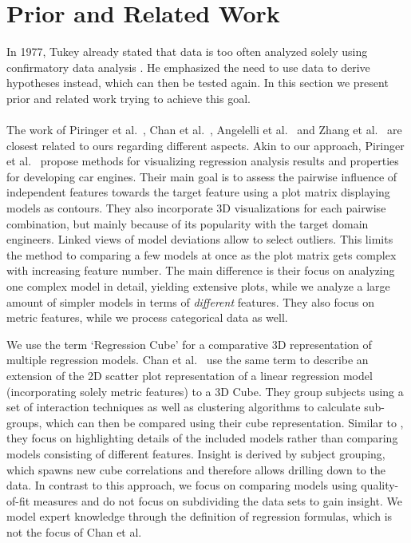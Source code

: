\documentclass[journal]{style/vgtc} 			          %
\begin{document}
\section{Prior and Related Work}
In 1977, Tukey already stated that data is too often analyzed solely using confirmatory data analysis \cite{Tukey}.
He emphasized the need to use data to derive hypotheses instead, which can then be tested again.
In this section we present prior and related work trying to achieve this goal.
\\\\
The work of Piringer et al.~\cite{Piringer}, Chan et al.~\cite{Chan}, Angelelli et al.~\cite{Angelelli} and Zhang et al.~\cite{Zhang2014} are closest related to ours regarding different aspects.
Akin to our approach, Piringer et al.~\cite{Piringer} propose methods for visualizing regression analysis results and properties for developing car engines.
Their main goal is to assess the pairwise influence of independent features towards the target feature using a plot matrix displaying models as contours.
They also incorporate 3D visualizations for each pairwise combination, but mainly because of its popularity with the target domain engineers.
Linked views of model deviations allow to select outliers.
This limits the method to comparing a few models at once as the plot matrix gets complex with increasing feature number.
The main difference is their focus on analyzing one complex model in detail, yielding extensive plots, while we analyze a large amount of simpler models in terms of \emph{different} features.
They also focus on metric features, while we process categorical data as well.

We use the term `Regression Cube' for a comparative 3D representation of multiple regression models.
Chan et al.~\cite{Chan} use the same term to describe an extension of the 2D scatter plot representation of a linear regression model (incorporating solely metric features) to a 3D Cube.
They group subjects using a set of interaction techniques as well as clustering algorithms to calculate sub-groups, which can then be compared using their cube representation.
Similar to \cite{Piringer}, they focus on highlighting details of the included models rather than comparing models consisting of different features.
Insight is derived by subject grouping, which spawns new cube correlations and therefore allows drilling down to the data.
In contrast to this approach, we focus on comparing models using quality-of-fit measures and do not focus on subdividing the data sets to gain insight.
We model expert knowledge through the definition of regression formulas, which is not the focus of Chan et al.
\end{document}
